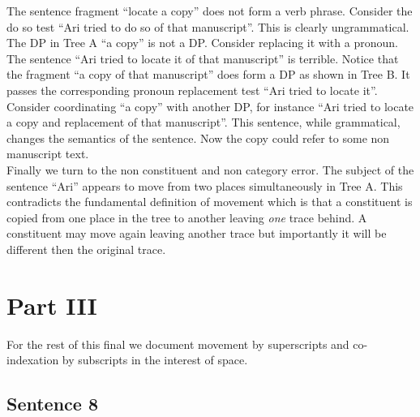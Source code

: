 \documentclass[20pt]{article}
\newcommand{\feature}[1]{\ensuremath{\left[ \text{#1} \right]}}
\newcommand{\treeScale}[0]{0.7}
\newcommand{\rolesOpacity}[0]{0.7}
\newcommand{\rolesOne}[0]{$<$$\theta$$>$}
\begin{document}
The sentence fragment ``locate a copy'' does not form a verb phrase. Consider
the do so test ``Ari tried to do so of that manuscript''. This is clearly
ungrammatical. \\

The DP in Tree A ``a copy'' is not a DP. Consider replacing it with a pronoun.
The sentence ``Ari tried to locate it of that manuscript'' is terrible. Notice
that the fragment ``a copy of that manuscript'' does form a DP as shown in Tree
B. It passes the corresponding pronoun replacement test ``Ari tried to locate
it''. Consider coordinating ``a copy'' with another DP, for instance ``Ari tried
to locate a copy and replacement of that manuscript''. This sentence, while
grammatical, changes the semantics of the sentence. Now the copy could refer to
some non manuscript text. \\

Finally we turn to the non constituent and non category error. The subject of
the sentence ``Ari'' appears to move from two places simultaneously in Tree A.
This contradicts the fundamental definition of movement which is that a
constituent is copied from one place in the tree to another leaving \textit{one}
trace behind. A constituent may move again leaving another trace but importantly
it will be different then the original trace.

\section*{Part III}
For the rest of this final we document movement by superscripts and
co-indexation by subscripts in the interest of space.
\subsection*{Sentence 8}
 \\
\end{document}

